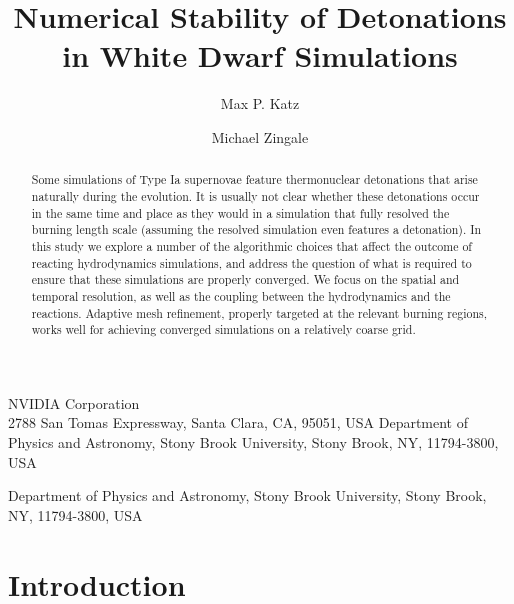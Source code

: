 \documentclass[twocolumn,numberedappendix]{../aastex62}
\begin{document}
\title{Numerical Stability of Detonations in White Dwarf Simulations}


\author{Max P. Katz}
\affiliation
{
  NVIDIA Corporation \\
  2788 San Tomas Expressway, Santa Clara, CA, 95051, USA
}
\affiliation
{
  Department of Physics and Astronomy, Stony Brook University, Stony Brook, NY, 11794-3800, USA
}

\author{Michael Zingale}
\affiliation
{
  Department of Physics and Astronomy, Stony Brook University, Stony Brook, NY, 11794-3800, USA
}



\begin{abstract}
Some simulations of Type Ia supernovae feature thermonuclear detonations that
arise naturally during the evolution. It is usually not clear whether these
detonations occur in the same time and place as they would in a simulation
that fully resolved the burning length scale (assuming the resolved simulation
even features a detonation). In this study we explore a number of the algorithmic
choices that affect the outcome of reacting hydrodynamics simulations, and address
the question of what is required to ensure that these simulations are properly
converged. We focus on the spatial and temporal resolution, as well as the coupling
between the hydrodynamics and the reactions. Adaptive mesh refinement, properly
targeted at the relevant burning regions, works well for achieving converged simulations
on a relatively coarse grid.
\end{abstract}

\section{Introduction}
\label{sec:introduction}
\end{document}

